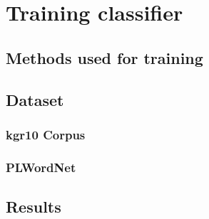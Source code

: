 \chapter{Training classifier}

\section{Methods used for training}

\section{Dataset}

\subsection{kgr10 Corpus}

\subsection{PLWordNet}

\section{Results}